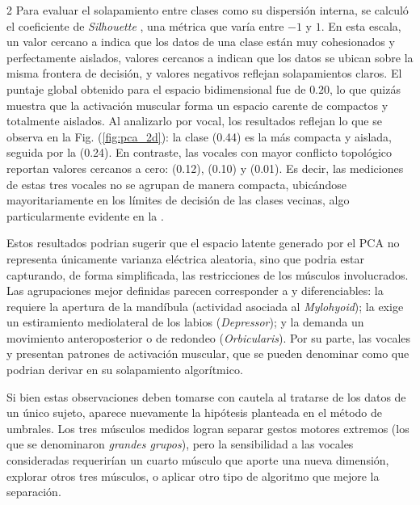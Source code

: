 \documentclass[11pt, letterpaper]{article}
\begin{document}
\begin{multicols*}{2}
Para evaluar el solapamiento entre clases como su dispersión interna, se calculó el coeficiente de \textit{Silhouette} \cite{silhouette}, una métrica que varía entre $-1$ y $1$. En esta escala, un valor cercano a  indica que los datos de una clase están muy cohesionados y perfectamente aislados, valores cercanos a  indican que los datos se ubican sobre la misma frontera de decisión, y valores negativos reflejan solapamientos claros. El puntaje global obtenido para el espacio bidimensional fue de $0.20$, lo que quizás muestra que la activación muscular forma un espacio carente de  compactos y totalmente aislados. Al analizarlo por vocal, los resultados reflejan lo que se observa en la Fig. (\ref{fig:pca_2d}): la clase  (0.44) es la más compacta y aislada, seguida por la  (0.24). En contraste, las vocales con mayor conflicto topológico reportan valores cercanos a cero:  (0.12),  (0.10) y  (0.01). Es decir, las mediciones de estas tres vocales no se agrupan de manera compacta, ubicándose mayoritariamente en los límites de decisión de las clases vecinas, algo particularmente evidente en la .

Estos resultados podrian sugerir que el espacio latente generado por el PCA no representa únicamente varianza eléctrica aleatoria, sino que podria estar capturando, de forma simplificada, las restricciones  de los músculos involucrados. Las agrupaciones mejor definidas parecen corresponder a  y diferenciables: la  requiere la apertura de la mandíbula (actividad asociada al \textit{Mylohyoid}); la  exige un estiramiento mediolateral de los labios (\textit{Depressor}); y la  demanda un movimiento anteroposterior o de redondeo (\textit{Orbicularis}). Por su parte, las vocales  y  presentan patrones de activación muscular, que se pueden denominar como  que podrian derivar en su solapamiento algorítmico.

Si bien estas observaciones deben tomarse con cautela al tratarse de los datos de un único sujeto, aparece nuevamente la hipótesis planteada en el método de umbrales. Los tres músculos medidos logran separar gestos motores extremos (los que se denominaron \textit{grandes grupos}), pero la sensibilidad a las vocales consideradas  requerirían un cuarto músculo que aporte una nueva dimensión, explorar otros tres músculos, o aplicar otro tipo de algoritmo que mejore la separación.


\end{multicols*}
\end{document}

